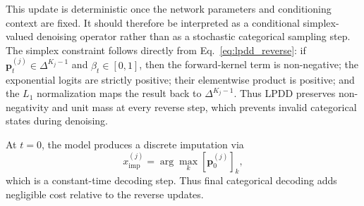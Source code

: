 \documentclass[times, review, 10pt]{elsarticle}
\newcommand{\DIFaddbegin}{\begingroup\color{blue}}
\newcommand{\DIFaddend}{\endgroup}
\begin{document}
\DIFaddbegin
This update is deterministic once the network parameters and conditioning
context are fixed. It should therefore be interpreted as a conditional
simplex-valued denoising operator rather than as a stochastic categorical
sampling step. The simplex constraint follows directly from
Eq.~\eqref{eq:lpdd_reverse}: if $\mathbf{p}_t^{(j)}\in\Delta^{K_j-1}$ and
$\beta_t\in[0,1]$, then the forward-kernel term is non-negative; the
exponential logits are strictly positive; their elementwise product is
positive; and the $L_1$ normalization maps the result back to
$\Delta^{K_j-1}$. Thus LPDD preserves non-negativity and unit mass at every
reverse step, which prevents invalid categorical states during denoising.

\DIFaddend
At $t=0$, the model produces a discrete imputation via
\[
x^{(j)}_{\text{imp}} = \arg\max_k [\mathbf{p}_0^{(j)}]_k,
\]
\DIFaddbegin
which is a constant-time decoding step. Thus final categorical decoding adds
negligible cost relative to the reverse updates.
\DIFaddend








\end{document}
